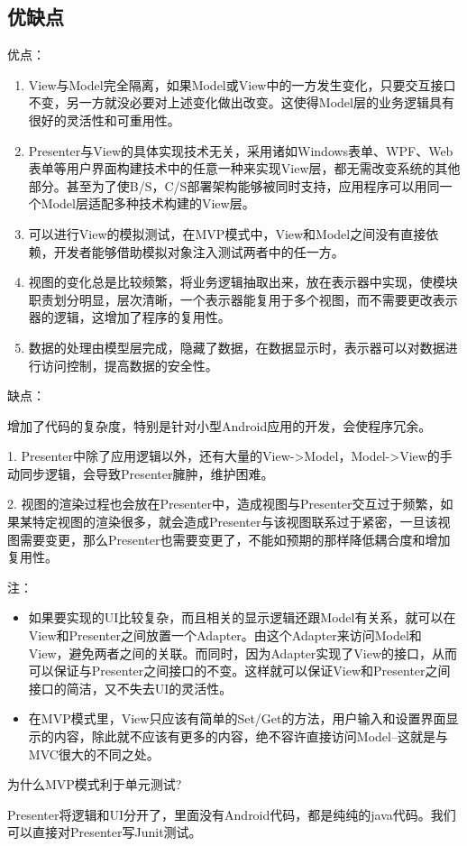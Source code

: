 \documentclass[a4paper,12pt]{ctexart}
\begin{document}
	\subsection{优缺点}
	优点：
	\begin{enumerate}
		\item View与Model完全隔离，如果Model或View中的一方发生变化，只要交互接口不变，另一方就没必要对上述变化做出改变。这使得Model层的业务逻辑具有很好的灵活性和可重用性。
		\item Presenter与View的具体实现技术无关，采用诸如Windows表单、WPF、Web表单等用户界面构建技术中的任意一种来实现View层，都无需改变系统的其他部分。甚至为了使B/S，C/S部署架构能够被同时支持，应用程序可以用同一个Model层适配多种技术构建的View层。
		\item 可以进行View的模拟测试，在MVP模式中，View和Model之间没有直接依赖，开发者能够借助模拟对象注入测试两者中的任一方。
		\item 视图的变化总是比较频繁，将业务逻辑抽取出来，放在表示器中实现，使模块职责划分明显，层次清晰，一个表示器能复用于多个视图，而不需要更改表示器的逻辑，这增加了程序的复用性。
		\item 数据的处理由模型层完成，隐藏了数据，在数据显示时，表示器可以对数据进行访问控制，提高数据的安全性。
	\end{enumerate}
	\par 缺点：
	\par 增加了代码的复杂度，特别是针对小型Android应用的开发，会使程序冗余。
	\par 1. Presenter中除了应用逻辑以外，还有大量的View->Model，Model->View的手动同步逻辑，会导致Presenter臃肿，维护困难。
	\par 2. 视图的渲染过程也会放在Presenter中，造成视图与Presenter交互过于频繁，如果某特定视图的渲染很多，就会造成Presenter与该视图联系过于紧密，一旦该视图需要变更，那么Presenter也需要变更了，不能如预期的那样降低耦合度和增加复用性。
	\par 注：
	\begin{itemize}
		\item 如果要实现的UI比较复杂，而且相关的显示逻辑还跟Model有关系，就可以在View和Presenter之间放置一个Adapter。由这个Adapter来访问Model和View，避免两者之间的关联。而同时，因为Adapter实现了View的接口，从而可以保证与Presenter之间接口的不变。这样就可以保证View和Presenter之间接口的简洁，又不失去UI的灵活性。
		\item 在MVP模式里，View只应该有简单的Set/Get的方法，用户输入和设置界面显示的内容，除此就不应该有更多的内容，绝不容许直接访问Model--这就是与MVC很大的不同之处。
	\end{itemize}
	为什么MVP模式利于单元测试?
	\par Presenter将逻辑和UI分开了，里面没有Android代码，都是纯纯的java代码。我们可以直接对Presenter写Junit测试。
\end{document}
